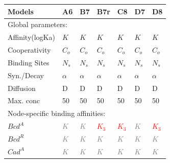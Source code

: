 \begin{table}[h]
\centering

\begin{tabular}{lllllll}
\hline
\multicolumn{1}{l|}{Models} & \multicolumn{1}{l|}{A6} & \multicolumn{1}{l|}{B7} & \multicolumn{1}{l|}{B7r} & \multicolumn{1}{l|}{C8} & \multicolumn{1}{l|}{D7} & \multicolumn{1}{l}{D8} \\ \hline
\multicolumn{7}{l}{Global parameters:} \\ \hline
Affinity(logKa) & $K$   & $K$   & $K$   &        $K$               &            $K$          &           $K$ \\
Cooperativity   & $C_o$ & $C_o$ & $C_o$ &       $C_o$                &               $C_o$        &           $C_o$            \\
Binding Sites   & $N_s$ & $N_s$ & $N_s$ &             $N_s$          &            $N_s$           &             $N_s$          \\
Syn./Decay      & $\alpha$ & $\alpha$ & $\alpha$                   &     $\alpha$                  &        $\alpha$               &      $\alpha$                 \\
Diffusion       & D & D & D &            D           &                 D      &               D        \\
Max. conc       & 50 & 50 &           50            &          50             &          50             &         50              \\ \hline
\multicolumn{7}{l}{Node-specific binding affinities:}                             \\ \hline
$Bcd^A$  & \textcolor{gray}{$K$} & \textcolor{gray}{$K$} & \textcolor{red}{$K_3$} & \textcolor{red}{$K_3$} & \textcolor{gray}{$K$} & \textcolor{red}{$K_3$} \\
$Bcd^R$                       &      \textcolor{gray}{$K$}                  &             \textcolor{gray}{$K$}           &       \textcolor{gray}{$K$}                 &      \textcolor{gray}{$K$}                  &       \textcolor{gray}{$K$}                 &         \textcolor{gray}{$K$}               \\
$Cad^A$                       &      \textcolor{gray}{$K$}                  &                \textcolor{gray}{$K$}        &     \textcolor{gray}{$K$}                   &         \textcolor{gray}{$K$}              &             \textcolor{gray}{$K$}           &          \textcolor{gray}{$K$}              \\

\end{tabular}
\end{table}
